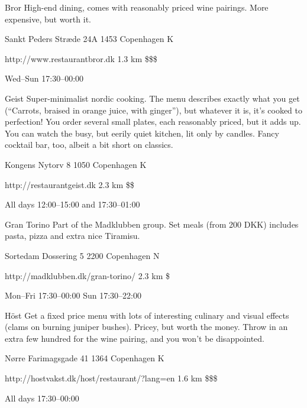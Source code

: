 \begin{fooditem}
{Bror}
{High-end dining, comes with reasonably priced wine pairings. More expensive, but worth it.}
{\begin{addr}
{Sankt Peders Stræde 24A}
{1453 Copenhagen K}
\end{addr}}
{http://www.restaurantbror.dk }
{1.3 km}
{\$\$\$}
{\begin{ohours}
{Wed–Sun}
{17:30–00:00}
{}
{}
{}
{}
{}
{}
\end{ohours}}
\end{fooditem}
\begin{fooditem}
{Geist}
{Super-minimalist nordic cooking. The menu describes exactly what you get (“Carrots, braised in orange juice, with ginger”), but whatever it is, it’s cooked to perfection! You order several small plates, each reasonably priced, but it adds up. You can watch the busy, but eerily quiet kitchen, lit only by candles. Fancy cocktail bar, too, albeit a bit short on classics.}
{\begin{addr}
{Kongens Nytorv 8}
{1050 Copenhagen K}
\end{addr}}
{http://restaurantgeist.dk}
{2.3 km}
{\$\$}
{\begin{ohours}
{All days}
{12:00–15:00 and 17:30–01:00}
{}
{}
{}
{}
{}
{}
\end{ohours}}
\end{fooditem}
\begin{fooditem}
{Gran Torino}
{Part of the Madklubben group. Set meals (from 200 DKK) includes pasta, pizza and extra nice Tiramisu.}
{\begin{addr}
{Sortedam Dossering 5}
{2200 Copenhagen N}
\end{addr}}
{http://madklubben.dk/gran-torino/}
{2.3 km}
{\$}
{\begin{ohours}
{Mon–Fri}
{17:30–00:00}
{Sun}
{17:30–22:00}
{}
{}
{}
{}
\end{ohours}}
\end{fooditem}
\begin{fooditem}
{Höst}
{Get a fixed price menu with lots of interesting culinary and visual effects (clams on burning juniper bushes). Pricey, but worth the money. Throw in an extra few hundred for the wine pairing, and you won't be disappointed.}
{\begin{addr}
{Nørre Farimagsgade 41}
{1364 Copenhagen K}
\end{addr}}
{http://hostvakst.dk/host/restaurant/?lang=en}
{1.6 km}
{\$\$\$}
{\begin{ohours}
{All days}
{17:30–00:00}
{}
{}
{}
{}
{}
{}
\end{ohours}}
\end{fooditem}
